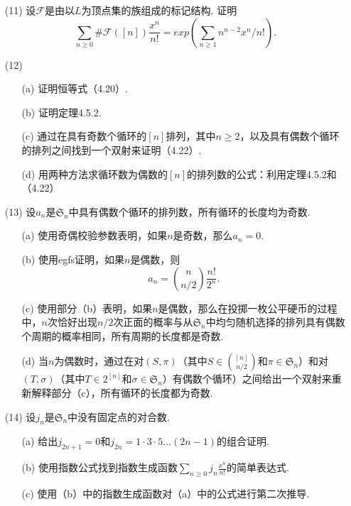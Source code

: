 \documentclass[a4paper,12pt]{ctexbook}
\begin{document}
\begin{enumerate}
	\item[(11)]
	设$\mathcal{F}$是由以$L$为顶点集的族组成的标记结构.  证明
	$$
	\sum_{n\geq0}\#\mathcal{F}([n])\frac{x^n}{n!}=exp\left(\sum_{n\geq1}n^{n-2}x^n/n!\right). 
	$$
\end{enumerate}

\begin{enumerate}
	\item[(12)]
	\begin{enumerate}
		\item[(a)] 证明恒等式（4.20）.  
		\item[(b)] 证明定理4.5.2.  
		\item[(c)] 通过在具有奇数个循环的$[n]$排列，其中$n\ge 2$，以及具有偶数个循环的排列之间找到一个双射来证明（4.22）.  
		\item[(d)] 用两种方法求循环数为偶数的$[n]$的排列数的公式：利用定理4.5.2和（4.22）
	\end{enumerate}
\end{enumerate}

\begin{enumerate}
	\item[(13)] 设$a_n$是$\mathfrak{S}_n$中具有偶数个循环的排列数，所有循环的长度均为奇数.  
	\begin{enumerate}
		\item[(a)] 使用奇偶校验参数表明，如果$n$是奇数，那么$a_n=0$.  
		\item[(b)] 使用egfs证明，如果$n$是偶数，则
		$$
		a_n=\binom{n}{n/2}\frac{n!}{2^n}. 
		$$
		\item[(c)] 使用部分（b）表明，如果$n$是偶数，那么在投掷一枚公平硬币的过程中，$n$次恰好出现$n/2$次正面的概率与从$\mathfrak{S}_n$中均匀随机选择的排列具有偶数个周期的概率相同，所有周期的长度都是奇数. 
		\item[(d)] 当$n$为偶数时，通过在对$(S,\pi)$（其中$S\in \binom{[n]}{n/2}$和$\pi\in\mathfrak{S}_n$）和对$(T,\sigma)$（其中$T\in2^{[n]}$和$\sigma\in\mathfrak{S}_n$）有偶数个循环）之间给出一个双射来重新解释部分（c），所有循环的长度都为奇数.  
	\end{enumerate}
\end{enumerate}

\begin{enumerate}
	\item[(14)] 设$j_n$是$\mathfrak{S}_n$中没有固定点的对合数.  
	\begin{enumerate}
		\item[(a)] 给出$j_{2n+1}=0$和$j_{2n}=1\cdot3\cdot5\dots(2n-1)$的组合证明. 
		\item[(b)] 使用指数公式找到指数生成函数$\sum_{n\geq0}j_n\frac{x^n}{n!}$的简单表达式. 
		\item[(c)] 使用（b）中的指数生成函数对（a）中的公式进行第二次推导.   
	\end{enumerate}
\end{enumerate}
\end{document}
